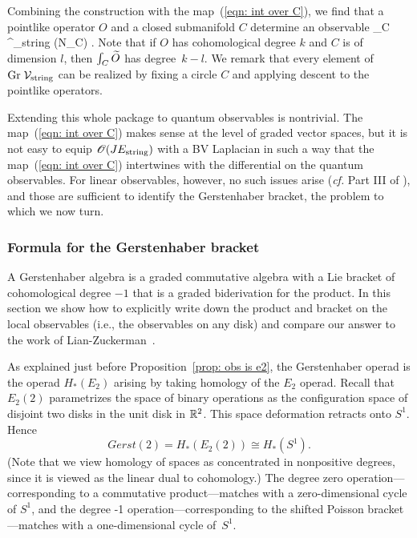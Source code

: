 Combining the construction with the map~(\ref{eqn: int over C}), 
we find that a pointlike operator $O$ and a closed submanifold $C$ determine an observable
\ben
\int_{C}  \in \Obs^\cl_{\rm string} (N_C) .
\een
Note that if $O$ has cohomological degree $k$ and $C$ is of dimension $l$, 
then $\int_C \Tilde{O}$ has degree~$k - l$. 
We remark that every element of $\Gr \cV_{\rm string}$ can be realized by fixing a circle $C$ and applying descent to the pointlike operators.

Extending this whole package to quantum observables is nontrivial. 
The map~(\ref{eqn: int over C}) makes sense at the level of graded vector spaces,
but it is not easy to equip $\sO(J E_{\rm string})$ with a BV Laplacian 
in such a way that the map~(\ref{eqn: int over C}) intertwines with the differential on the quantum observables.
For linear observables, however, no such issues arise
({\em cf.} Part III of \cite{GGW}), 
and those are sufficient to identify the Gerstenhaber bracket,
the problem to which we now turn.

\subsubsection{Formula for the Gerstenhaber bracket}

A Gerstenhaber algebra is a graded commutative algebra with a Lie bracket of cohomological degree $-1$ that is a graded biderivation for the product. 
In this section we show how to explicitly write down the product and bracket on the local observables (i.e., the observables on any disk) and compare our answer to the work of Lian-Zuckerman~\cite{LZ1}.

As explained just before Proposition~\ref{prop: obs is e2}, 
the Gerstenhaber operad is the operad $H_*(E_2)$ arising by taking homology of the $E_2$ operad.
Recall that $E_2(2)$ parametrizes the space of binary operations as the configuration space of disjoint two disks in the unit disk in $\RR^2$.
This space deformation retracts onto $S^1$.
Hence 
\[
Gerst(2) = H_*(E_2(2)) \cong H_*(S^1). 
\]
(Note that we view homology of spaces as concentrated in nonpositive degrees,
since it is viewed as the linear dual to cohomology.)
The degree zero operation---corresponding to a commutative product---matches with a zero-dimensional cycle of $S^1$,
and the degree -1 operation---corresponding to the shifted Poisson bracket---matches with a one-dimensional cycle of~$S^1$. 

